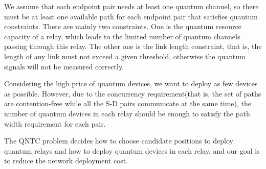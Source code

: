 We assume that each endpoint pair needs at least one quantum channel, so there must be at least one available path for each endpoint pair that satisfies quantum constraints. There are mainly two constraints. One is the quantum resource capacity of a relay, which leads to the limited number of quantum channels passing through this relay. The other one is the link length constraint, that is, the length of any link must not exceed a given threshold, otherwise the quantum signals will not be measured correctly.

Considering the high price of quantum devices, we want to deploy as few devices as possible. However, due to the concurrency requirement(that is, the set of paths are contention-free while all the S-D pairs communicate at the same time), the number of quantum devices in each relay should be enough to satisfy the path width requirement for each pair.

The QNTC problem decides how to choose candidate positions to deploy quantum relays and how to deploy quantum devices in each relay. and our goal is to reduce the network deployment cost.









